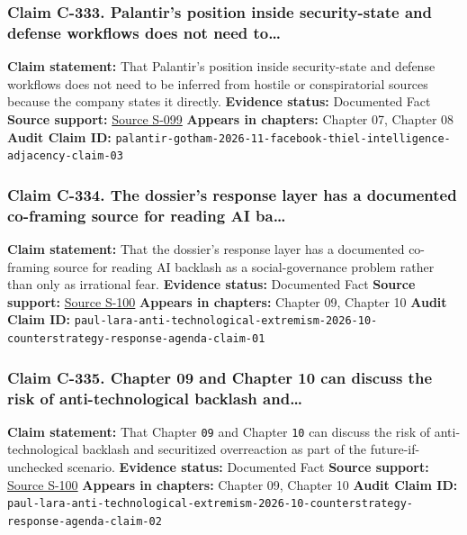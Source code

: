 \documentclass[
  american,
  11pt,
  letterpaper,
]{article}
\begin{document}
\subsubsection{Claim C-333. Palantir's position inside security-state
and defense workflows does not need
to\ldots{}}\label{claim-c-333-palantir-s-position-inside-security-state-and-defense-workflows-does-not-need-to}

\textbf{Claim statement:} That Palantir's position inside security-state
and defense workflows does not need to be inferred from hostile or
conspiratorial sources because the company states it directly.
\textbf{Evidence status:} Documented Fact \textbf{Source support:}
\hyperref[source-s-099-gotham]{Source S-099} \textbf{Appears in
chapters:} Chapter 07, Chapter 08 \textbf{Audit Claim ID:}
\texttt{palantir-gotham-2026-11-facebook-thiel-intelligence-adjacency-claim-03}

\subsubsection{Claim C-334. The dossier's response layer has a
documented co-framing source for reading AI
ba\ldots{}}\label{claim-c-334-the-dossier-s-response-layer-has-a-documented-co-framing-source-for-reading-ai-ba}

\textbf{Claim statement:} That the dossier's response layer has a
documented co-framing source for reading AI backlash as a
social-governance problem rather than only as irrational fear.
\textbf{Evidence status:} Documented Fact \textbf{Source support:}
\hyperref[source-s-100-extremismo-antitecnol-gico]{Source S-100}
\textbf{Appears in chapters:} Chapter 09, Chapter 10 \textbf{Audit Claim
ID:}
\texttt{paul-lara-anti-technological-extremism-2026-10-counterstrategy-response-agenda-claim-01}

\subsubsection{Claim C-335. Chapter 09 and Chapter 10 can discuss the
risk of anti-technological backlash
and\ldots{}}\label{claim-c-335-chapter-09-and-chapter-10-can-discuss-the-risk-of-anti-technological-backlash-and}

\textbf{Claim statement:} That Chapter \texttt{09} and Chapter
\texttt{10} can discuss the risk of anti-technological backlash and
securitized overreaction as part of the future-if-unchecked scenario.
\textbf{Evidence status:} Documented Fact \textbf{Source support:}
\hyperref[source-s-100-extremismo-antitecnol-gico]{Source S-100}
\textbf{Appears in chapters:} Chapter 09, Chapter 10 \textbf{Audit Claim
ID:}
\texttt{paul-lara-anti-technological-extremism-2026-10-counterstrategy-response-agenda-claim-02}
\end{document}
